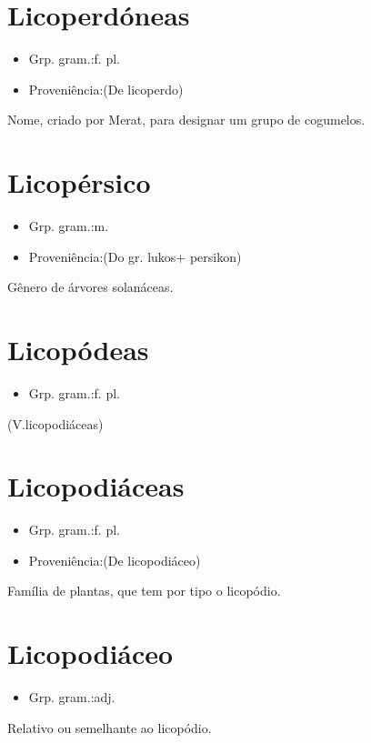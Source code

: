 \section{Licoperdóneas}
\begin{itemize}
\item {Grp. gram.:f. pl.}
\end{itemize}
\begin{itemize}
\item {Proveniência:(De \textunderscore licoperdo\textunderscore )}
\end{itemize}
Nome, criado por Merat, para designar um grupo de cogumelos.
\section{Licopérsico}
\begin{itemize}
\item {Grp. gram.:m.}
\end{itemize}
\begin{itemize}
\item {Proveniência:(Do gr. \textunderscore lukos\textunderscore  + \textunderscore persikon\textunderscore )}
\end{itemize}
Gênero de árvores solanáceas.
\section{Licopódeas}
\begin{itemize}
\item {Grp. gram.:f. pl.}
\end{itemize}
(V.licopodiáceas)
\section{Licopodiáceas}
\begin{itemize}
\item {Grp. gram.:f. pl.}
\end{itemize}
\begin{itemize}
\item {Proveniência:(De \textunderscore licopodiáceo\textunderscore )}
\end{itemize}
Família de plantas, que tem por tipo o licopódio.
\section{Licopodiáceo}
\begin{itemize}
\item {Grp. gram.:adj.}
\end{itemize}
Relativo ou semelhante ao licopódio.

